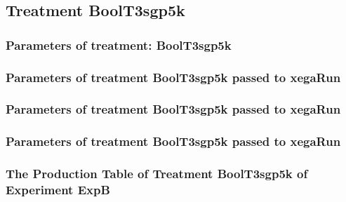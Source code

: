\documentclass[18pt,c]{beamer}
\makeatletter
\def\beamer@writeslidentry@miniframesoff{%
  \expandafter\beamer@ifempty\expandafter{\beamer@framestartpage}{}%
  {%
   \clearpage\beamer@notesactions%
  }
}
\newcommand*{\miniframesoff}{\let\beamer@writeslidentry=\beamer@writeslidentry@miniframesoff}
\makeatother
\begin{document}
\miniframesoff
\subsection{Treatment BoolT3sgp5k}

 \begin{frame}
 \fontsize{8pt}{9pt}\selectfont
 \frametitle{  Parameters of treatment: BoolT3sgp5k 
 }

 \label{ExpBtParmTable072.tex}  
 \end{frame}


 \begin{frame}
 \fontsize{8pt}{9pt}\selectfont
 \frametitle{  Parameters of treatment BoolT3sgp5k passed to xegaRun
 }

 \label{ExpBtParmTable073.tex}  
 \end{frame}


 \begin{frame}
 \fontsize{8pt}{9pt}\selectfont
 \frametitle{  Parameters of treatment BoolT3sgp5k passed to xegaRun
 }

 \label{ExpBtParmTable074.tex}  
 \end{frame}


 \begin{frame}
 \fontsize{8pt}{9pt}\selectfont
 \frametitle{  Parameters of treatment BoolT3sgp5k passed to xegaRun
 }

 \label{ExpBtParmTable075.tex}  
 \end{frame}

 \begin{frame}
 \fontsize{8pt}{9pt}\selectfont
 \frametitle{ The Production Table of Treatment BoolT3sgp5k of Experiment ExpB }

 \label{ExpBGrammarTable022.tex}  
 \end{frame}
\end{document}
